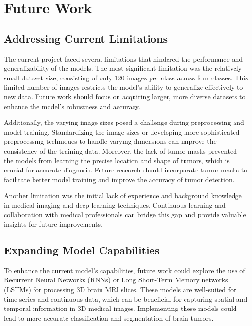 \section{Future Work}\label{Future Work}

\subsection{Addressing Current Limitations}

The current project faced several limitations that hindered the performance and generalizability of the models. The most significant limitation was the relatively small dataset size, consisting of only 120 images per class across four classes. This limited number of images restricts the model's ability to generalize effectively to new data. Future work should focus on acquiring larger, more diverse datasets to enhance the model's robustness and accuracy.

Additionally, the varying image sizes posed a challenge during preprocessing and model training. Standardizing the image sizes or developing more sophisticated preprocessing techniques to handle varying dimensions can improve the consistency of the training data. Moreover, the lack of tumor masks prevented the models from learning the precise location and shape of tumors, which is crucial for accurate diagnosis. Future research should incorporate tumor masks to facilitate better model training and improve the accuracy of tumor detection.

Another limitation was the initial lack of experience and background knowledge in medical imaging and deep learning techniques. Continuous learning and collaboration with medical professionals can bridge this gap and provide valuable insights for future improvements.

\subsection{Expanding Model Capabilities}

To enhance the current model's capabilities, future work could explore the use of Recurrent Neural Networks (RNNs) or Long Short-Term Memory networks (LSTMs) for processing 3D brain MRI slices. These models are well-suited for time series and continuous data, which can be beneficial for capturing spatial and temporal information in 3D medical images. Implementing these models could lead to more accurate classification and segmentation of brain tumors.

